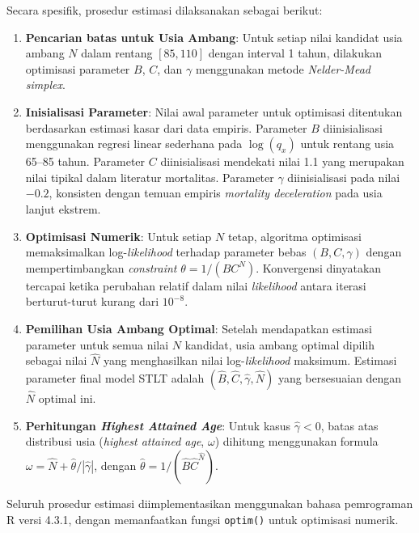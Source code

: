 Secara spesifik, prosedur estimasi dilaksanakan sebagai berikut:

\begin{enumerate}
    \item \textbf{Pencarian batas untuk Usia Ambang}: Untuk setiap nilai kandidat usia ambang $N$ dalam rentang $[85, 110]$ dengan interval 1 tahun, dilakukan optimisasi parameter $B$, $C$, dan $\gamma$ menggunakan metode \textit{Nelder-Mead simplex}.
    
    \item \textbf{Inisialisasi Parameter}: Nilai awal parameter untuk optimisasi ditentukan berdasarkan estimasi kasar dari data empiris. Parameter $B$ diinisialisasi menggunakan regresi linear sederhana pada $\log(q_x)$ untuk rentang usia 65--85 tahun. Parameter $C$ diinisialisasi mendekati nilai 1.1 yang merupakan nilai tipikal dalam literatur mortalitas. Parameter $\gamma$ diinisialisasi pada nilai $-0.2$, konsisten dengan temuan empiris \textit{mortality deceleration} pada usia lanjut ekstrem.
    
    \item \textbf{Optimisasi Numerik}: Untuk setiap $N$ tetap, algoritma optimisasi memaksimalkan log-\textit{likelihood} terhadap parameter bebas $(B, C, \gamma)$ dengan mempertimbangkan \textit{constraint} $\theta = 1/(BC^N)$. Konvergensi dinyatakan tercapai ketika perubahan relatif dalam nilai \textit{likelihood} antara iterasi berturut-turut kurang dari $10^{-8}$.
    
    \item \textbf{Pemilihan Usia Ambang Optimal}: Setelah mendapatkan estimasi parameter untuk semua nilai $N$ kandidat, usia ambang optimal dipilih sebagai nilai $\hat{N}$ yang menghasilkan nilai log-\textit{likelihood} maksimum. Estimasi parameter final model STLT adalah $(\hat{B}, \hat{C}, \hat{\gamma}, \hat{N})$ yang bersesuaian dengan $\hat{N}$ optimal ini.
    
    \item \textbf{Perhitungan \textit{Highest Attained Age}}: Untuk kasus $\hat{\gamma} < 0$, batas atas distribusi usia (\textit{highest attained age}, $\omega$) dihitung menggunakan formula $\omega = \hat{N} + \hat{\theta}/|\hat{\gamma}|$, dengan $\hat{\theta} = 1/(\hat{B}\hat{C}^{\hat{N}})$.
\end{enumerate}

Seluruh prosedur estimasi diimplementasikan menggunakan bahasa pemrograman R versi 4.3.1, dengan memanfaatkan fungsi \texttt{optim()} untuk optimisasi numerik.

